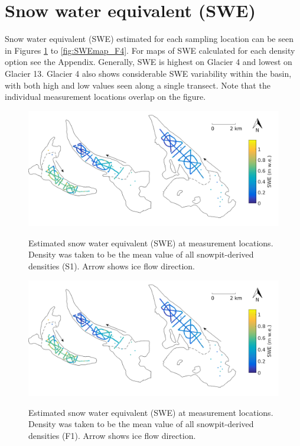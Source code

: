 \documentclass[12pt]{article}
\begin{document}
\section{Snow water equivalent (SWE)}

Snow water equivalent (SWE) estimated for each sampling location can be seen in Figures  \ref{fig:SWEmap_S1} to \ref{fig:SWEmap_F4}. For maps of SWE calculated for each density option see the Appendix. Generally, SWE is highest on Glacier 4 and lowest on Glacier 13. Glacier 4 also shows considerable SWE variability within the basin, with both high and low values seen along a single transect. Note that the individual measurement locations overlap on the figure.

\begin{figure}[H]
	\centering
	\includegraphics[width = \textwidth]{SWEmap_opt2.png}\\
	\caption{Estimated snow water equivalent (SWE) at measurement locations. Density was taken to be the mean value of all snowpit-derived densities (S1). Arrow shows ice flow direction.}
	\label{fig:SWEmap_S1}
\end{figure}

\begin{figure}[H]
	\centering
	\includegraphics[width = \textwidth]{SWEmap_opt3.png}\\
	\caption{Estimated snow water equivalent (SWE) at measurement locations. Density was taken to be the mean value of all snowpit-derived densities (F1). Arrow shows ice flow direction.}
	\label{fig:SWEmap_F1}
\end{figure}
\end{document}
